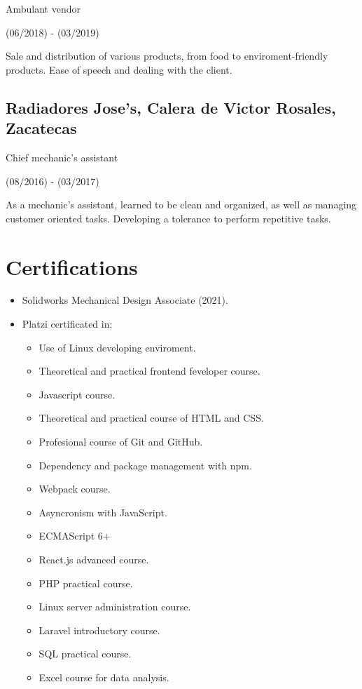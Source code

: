 \documentclass{article}
\begin{document}
  Ambulant vendor

  (06/2018) - (03/2019)

  Sale and distribution of various products, from food to enviroment-friendly products. Ease of speech and dealing with the client.

  \subsection{\textbf{Radiadores Jose's}, Calera de Victor Rosales, Zacatecas}

  Chief mechanic's assistant

  (08/2016) - (03/2017)

  As a mechanic's assistant, learned to be clean and organized, as well as managing customer oriented tasks. Developing a tolerance to perform repetitive tasks.


  \section{Certifications}

  \begin{itemize}
    \item Solidworks Mechanical Design Associate (2021).
    \item Platzi certificated in:
      \begin{itemize}
        \item Use of Linux developing enviroment.
        \item Theoretical and practical frontend feveloper course.
        \item Javascript course.
        \item Theoretical and practical course of HTML and CSS.
        \item Profesional course of Git and GitHub.
        \item Dependency and package management with npm.
        \item Webpack course.
        \item Asyncronism with JavaScript.
        \item ECMAScript 6+
        \item React.js advanced course.
        \item PHP practical course.
        \item Linux server administration course.
        \item Laravel introductory course.
        \item SQL practical course.
        \item Excel course for data analysis.
      \end{itemize}
  \end{itemize}
\end{document}
